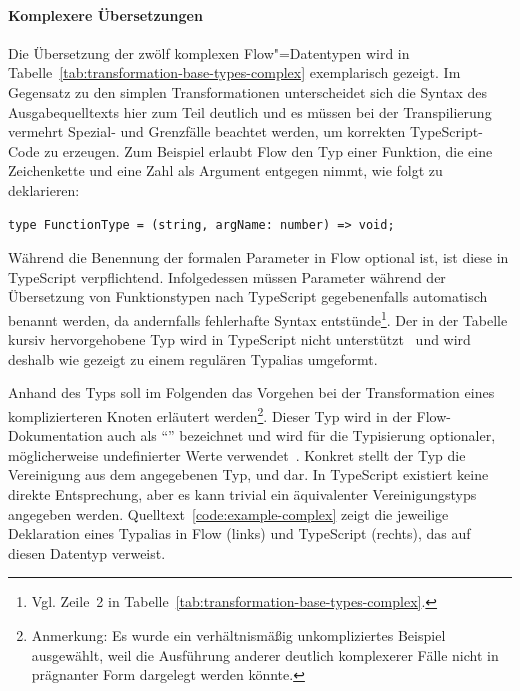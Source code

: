 \vspace{-0.5\baselineskip}
\paragraph{Komplexere Übersetzungen}

Die Übersetzung der zwölf komplexen Flow"=Datentypen wird in Tabelle~\ref{tab:transformation-base-types-complex} exemplarisch gezeigt. Im Gegensatz zu den simplen Transformationen unterscheidet sich die Syntax des Ausgabequelltexts hier zum Teil deutlich und es müssen bei der Transpilierung vermehrt Spezial- und Grenzfälle beachtet werden, um korrekten TypeScript-Code zu erzeugen. Zum Beispiel erlaubt Flow den Typ einer Funktion, die eine Zeichenkette und eine Zahl als Argument entgegen nimmt, wie folgt zu deklarieren:

\begin{lstlisting}[numbers=none]
type FunctionType = (string, argName: number) => void;
\end{lstlisting}

Während die Benennung der formalen Parameter in Flow optional ist, ist diese in TypeScript verpflichtend. Infolgedessen müssen Parameter während der Übersetzung von Funktionstypen nach TypeScript gegebenenfalls automatisch benannt werden, da andernfalls fehlerhafte Syntax entstünde\footnote{Vgl. Zeile~2 in Tabelle~\ref{tab:transformation-base-types-complex}.}.
Der in der Tabelle kursiv hervorgehobene Typ  wird in TypeScript nicht unterstützt~\autocite{TS:GITHUB:NO_OPAQUE_TYPE} und wird deshalb wie gezeigt zu einem regulären Typalias umgeformt.

\tablespace


Anhand des Typs  soll im Folgenden das Vorgehen bei der Transformation eines komplizierteren Knoten erläutert werden\footnote{Anmerkung: Es wurde ein verhältnismäßig unkompliziertes Beispiel ausgewählt, weil die Ausführung anderer deutlich komplexerer Fälle nicht in prägnanter Form dargelegt werden könnte.}. Dieser Typ wird in der Flow-Dokumentation auch als \enquote{} bezeichnet und wird für die Typisierung optionaler, möglicherweise undefinierter Werte verwendet~\autocite{FLOW:MAYBE_TYPES}. Konkret stellt der Typ die Vereinigung aus dem angegebenen Typ,  und  dar. In TypeScript existiert keine direkte Entsprechung, aber es kann trivial ein äquivalenter Vereinigungstyps angegeben werden. Quelltext~\ref{code:example-complex} zeigt die jeweilige Deklaration eines Typalias in Flow (links) und TypeScript (rechts), das auf diesen Datentyp verweist.

